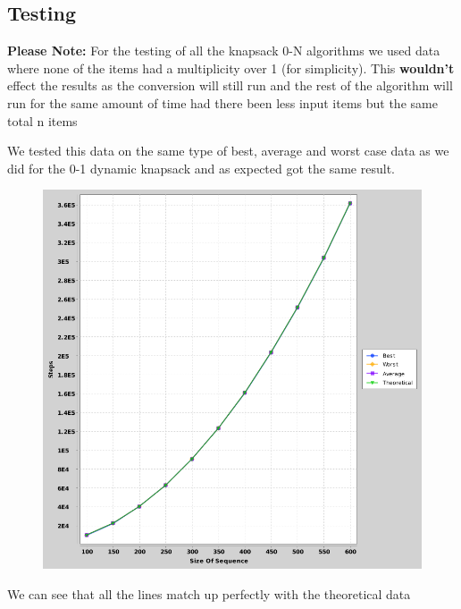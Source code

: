 \documentclass{article}
\begin{document}
			\break
		\subsection{Testing}
			\textbf{Please Note:} For the testing of all the knapsack 0-N algorithms we used data where none of the items had a multiplicity over 1 (for simplicity). This \textbf{wouldn't} effect the results as the conversion will still run and the rest of the algorithm will run for the same amount of time had there been less input items but the same total n items\newline		
		
			We tested this data on the same type of best, average and worst case data as we did for the 0-1 dynamic knapsack and as expected got the same result. 
			
			\begin{figure}[h]
				\vspace{3mm}
				\begin{center}
					\includegraphics[scale=0.4]{Dynamic0N.png}
				\end{center}
			\end{figure}
			
			We can see that all the lines match up perfectly with the theoretical data
			
	
	\break			
\end{document}

